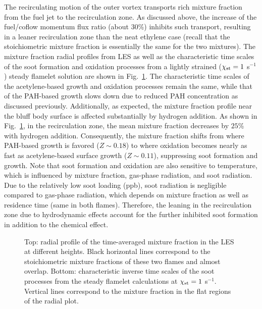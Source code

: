 The recirculating motion of the outer vortex transports rich mixture fraction from the fuel jet to the recirculation zone.  As discussed above, the increase of the fuel/coflow momentum flux ratio (about 30\%) inhibits such transport, resulting in a leaner recirculation zone than the neat ethylene case (recall that the stoichiometric mixture fraction is essentially the same for the two mixtures).  The mixture fraction radial profiles from LES as well as the characteristic time scales of the soot formation and oxidation processes from a lightly strained ($\chi_{\rm st} = 1$ s$^{-1}$) steady flamelet solution are shown in Fig.~\ref{fig:timescale}.  The characteristic time scales of the acetylene-based growth and oxidation processes remain the same, while that of the PAH-based growth slows down due to reduced PAH concentration as discussed previously.  Additionally, as expected, the mixture fraction profile near the bluff body surface is affected substantially by hydrogen addition.  As shown in Fig.~\ref{fig:timescale}, in the recirculation zone, the mean mixture fraction decreases by $25$\% with hydrogen addition.  Consequently, the mixture fraction shifts from where PAH-based growth is favored ($Z \sim 0.18$) to where oxidation becomes nearly as fast as acetylene-based surface growth ($Z \sim 0.11$), suppressing soot formation and growth.  Note that soot formation and oxidation are also sensitive to temperature, which is influenced by mixture fraction, gas-phase radiation, and soot radiation.  Due to the relatively low soot loading (ppb), soot radiation is negligible compared to gas-phase radiation, which depends on mixture fraction as well as residence time (same in both flames).  Therefore, the leaning in the recirculation zone due to hydrodynamic effects account for the further inhibited soot formation in addition to the chemical effect.

\begin{figure}[t]
  \centering
  \scriptsize
  \resizebox{0.7\textwidth}{!}{}
  \resizebox{0.7\textwidth}{!}{}
  \normalsize
  \caption{Top: radial profile of the time-averaged mixture fraction in the LES at different heights.  Black horizontal lines correspond to the stoichiometric mixture fractions of these two flames and almost overlap.  Bottom: characteristic inverse time scales of the soot processes from the steady flamelet calculations at $\chi_{\rm st} = 1$ s$^{-1}$.  Vertical lines correspond to the mixture fraction in the flat regions of the radial plot.}
  \label{fig:timescale}
\end{figure}

